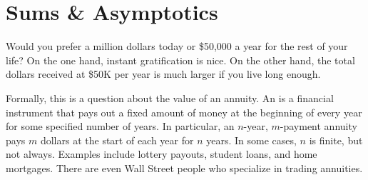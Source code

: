 \chapter{Sums \& Asymptotics}\label{asymptotics_chap}

\label{annuity_sec}

Would you prefer a million dollars today or \$50,000 a year for the
rest of your life?  On the one hand, instant gratification is nice.
On the other hand, the total dollars received at \$50K per year is
much larger if you live long enough.

Formally, this is a question about the value of an annuity.  An
 is a financial instrument that pays out a fixed amount of
money at the beginning of every year for some specified number of years.
In particular, an $n$-year, $m$-payment annuity pays $m$ dollars at the
start of each year for $n$ years.  In some cases, $n$ is finite, but not
always.  Examples include lottery payouts, student loans, and home
mortgages.  There are even Wall Street people who specialize in trading
annuities.

